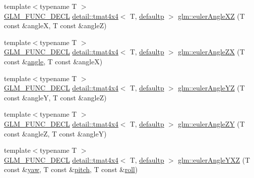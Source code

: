 \begin{DoxyCompactItemize}
\item 
{\footnotesize template$<$typename T $>$ }\\\hyperlink{setup_8hpp_ab2d052de21a70539923e9bcbf6e83a51}{G\+L\+M\+\_\+\+F\+U\+N\+C\+\_\+\+D\+E\+CL} \hyperlink{structglm_1_1detail_1_1tmat4x4}{detail\+::tmat4x4}$<$ T, \hyperlink{namespaceglm_a0f04f086094c747d227af4425893f545a9d21ccd8b5a009ec7eb7677befc3bf51}{defaultp} $>$ \hyperlink{group__gtx__euler__angles_ga61110cb520fbf21dd541cf4e25d81a65}{glm\+::euler\+Angle\+XZ} (T const \&angleX, T const \&angleZ)
\item 
{\footnotesize template$<$typename T $>$ }\\\hyperlink{setup_8hpp_ab2d052de21a70539923e9bcbf6e83a51}{G\+L\+M\+\_\+\+F\+U\+N\+C\+\_\+\+D\+E\+CL} \hyperlink{structglm_1_1detail_1_1tmat4x4}{detail\+::tmat4x4}$<$ T, \hyperlink{namespaceglm_a0f04f086094c747d227af4425893f545a9d21ccd8b5a009ec7eb7677befc3bf51}{defaultp} $>$ \hyperlink{group__gtx__euler__angles_ga5766bbe3f5b17b5c33ed21b2933ff278}{glm\+::euler\+Angle\+ZX} (T const \&\hyperlink{group__gtc__quaternion_ga23a3fc7ada5bbb665ff84c92c6e0542c}{angle}, T const \&angleX)
\item 
{\footnotesize template$<$typename T $>$ }\\\hyperlink{setup_8hpp_ab2d052de21a70539923e9bcbf6e83a51}{G\+L\+M\+\_\+\+F\+U\+N\+C\+\_\+\+D\+E\+CL} \hyperlink{structglm_1_1detail_1_1tmat4x4}{detail\+::tmat4x4}$<$ T, \hyperlink{namespaceglm_a0f04f086094c747d227af4425893f545a9d21ccd8b5a009ec7eb7677befc3bf51}{defaultp} $>$ \hyperlink{group__gtx__euler__angles_ga4bff0f8324770261d3a6ddadd790ec22}{glm\+::euler\+Angle\+YZ} (T const \&angleY, T const \&angleZ)
\item 
{\footnotesize template$<$typename T $>$ }\\\hyperlink{setup_8hpp_ab2d052de21a70539923e9bcbf6e83a51}{G\+L\+M\+\_\+\+F\+U\+N\+C\+\_\+\+D\+E\+CL} \hyperlink{structglm_1_1detail_1_1tmat4x4}{detail\+::tmat4x4}$<$ T, \hyperlink{namespaceglm_a0f04f086094c747d227af4425893f545a9d21ccd8b5a009ec7eb7677befc3bf51}{defaultp} $>$ \hyperlink{group__gtx__euler__angles_gaeabd76319f5a19188a0423769950df76}{glm\+::euler\+Angle\+ZY} (T const \&angleZ, T const \&angleY)
\item 
{\footnotesize template$<$typename T $>$ }\\\hyperlink{setup_8hpp_ab2d052de21a70539923e9bcbf6e83a51}{G\+L\+M\+\_\+\+F\+U\+N\+C\+\_\+\+D\+E\+CL} \hyperlink{structglm_1_1detail_1_1tmat4x4}{detail\+::tmat4x4}$<$ T, \hyperlink{namespaceglm_a0f04f086094c747d227af4425893f545a9d21ccd8b5a009ec7eb7677befc3bf51}{defaultp} $>$ \hyperlink{group__gtx__euler__angles_gab9bc80f4f579efd8f0d161e8b58ff452}{glm\+::euler\+Angle\+Y\+XZ} (T const \&\hyperlink{group__gtc__quaternion_ga1de7653ddf380ff06d2300eea831664c}{yaw}, T const \&\hyperlink{group__gtc__quaternion_ga4d345dc369a54f53f5ebc375bac56d11}{pitch}, T const \&\hyperlink{group__gtc__quaternion_ga6d883e423bc425f4334fcce202131f7e}{roll})

\end{DoxyCompactItemize}
